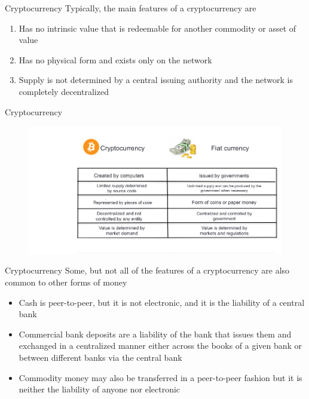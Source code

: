 \documentclass[10pt]{beamer}
\begin{document}
\begin{frame}{Cryptocurrency}
	Typically, the main features of a cryptocurrency are
	\begin{enumerate}
		\item Has no intrinsic value that is redeemable for another commodity or asset of value
		\item Has no physical form and exists only on the network
		\item Supply is not determined by a central issuing authority and the network is completely decentralized
	\end{enumerate}
\end{frame}


\begin{frame}{Cryptocurrency}
	\begin{figure}[]
		\centering
		\includegraphics  [scale=0.3]{Images/cryptovsfiat}
	\end{figure}
\end{frame}


\begin{frame}{Cryptocurrency}
	Some, but not all of the features of a cryptocurrency are also common to other forms of money
	\begin{itemize}
		\item Cash is peer-to-peer, but it is not electronic, and it is the liability of a central bank
		\item Commercial bank deposits are a liability of the bank that issues them and exchanged in a centralized manner either across the books of a given bank or between different banks via the central bank
		\item Commodity money may also be transferred in a peer-to-peer fashion but it is neither the liability of anyone nor electronic
	\end{itemize}
\end{frame}
\end{document}
